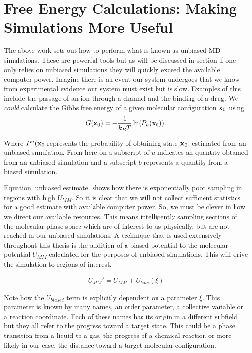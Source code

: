 \section{Free Energy Calculations: Making Simulations More Useful}
The above work sets out how to perform what is known as unbiased MD simulations. These are powerful tools but as will be discussed in section  if one only relies on unbiased simulations they will quickly exceed the available computer power. Imagine there is an event our system undergoes that we know from experimental evidence our system must exist but is slow. Examples of this include the passage of an ion through a channel and the binding of a drug. We \textit{could} calculate the Gibbs free energy of a given molecular configuration $\bold{x}_0$ using 
\begin{equation}
	G (\bold{x}_0) = -\frac{1}{k_BT}\ln(P_{u}(\bold{x}_0)).
	\label{unbiased_estimate}
\end{equation}

Where $P^u(\bold{x}_0$ represents the probability of obtaining state $\bold{x}_0$, estimated from an unbiased simulation. From here on a subscript of $u$ indicates an quantity obtained from an unbiased simulation and a subscript $b$ represents a quantity from a biased simulation. 

Equation \ref{unbiased estimate} shows how there is exponentially poor sampling in regions with high $U_{MM}$. So it is clear that we will not collect sufficient statistics for a good estimate with available computer power. So, we must be clever in how we direct our available resources. This means intelligently sampling sections of the molecular phase space which are of interest to us physically, but are not reached in our unbiased simulations. A technique that is used extensively throughout this thesis is the addition of a biased potential to the molecular potential $U_{MM}$ calculated for the purposes of unbiased simulations. This will drive the simulation to regions of interest. 

\begin{equation}
\begin{aligned}
U_{MM}'  = U_{MM} + U_{bias} (\xi)
\end{aligned}
\end{equation}

Note how the $U_{biased}$ term is explicitly dependent on a parameter $\xi$. This parameter is known by many names, an order parameter, a collective variable or a reaction coordinate. Each of these names has its origin in a different subfield but they all refer to the progress toward a target state. This could be a phase transition from a liquid to a gas, the progress of a chemical reaction or more likely in our case, the distance toward a target molecular configuration. 

